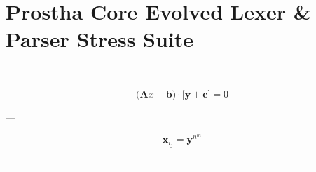 \documentclass{article}
\begin{document}
\section{Prostha Core Evolved Lexer & Parser Stress Suite}

---

\begin{equation}
\biggl( \mathbf{A}x - \mathbf{b} \bigr) \cdot \bigl[ \mathbf{y} + \mathbf{c} \biggr] = 0
\end{equation}

---

\begin{equation}
\mathbf{x}_i_j = \mathbf{y}^n^m
\end{equation}

---
\end{document}
